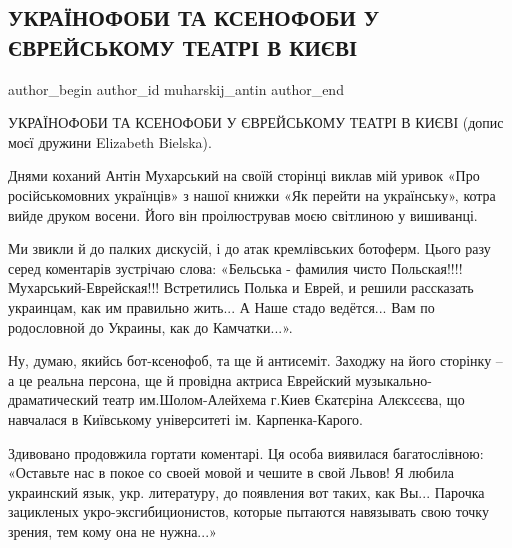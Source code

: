  
 
 
 
 
 
\subsection{УКРАЇНОФОБИ ТА КСЕНОФОБИ У ЄВРЕЙСЬКОМУ ТЕАТРІ В КИЄВІ}
\label{sec:27_07_2021.fb.muharskij_antin.1.kiev_ksenofobia_teatr}
 
\ifcmt
 author_begin
   author_id muharskij_antin
 author_end
\fi

УКРАЇНОФОБИ ТА КСЕНОФОБИ У ЄВРЕЙСЬКОМУ ТЕАТРІ В КИЄВІ (допис моєї дружини Elizabeth Bielska).

Днями коханий Антін Мухарський на своїй сторінці виклав мій уривок «Про
російськомовних українців» з нашої книжки «Як перейти на українську», котра
вийде друком восени. Його він проілюстрував моєю світлиною у вишиванці. 

Ми звикли й до палких дискусій, і до атак кремлівських ботоферм. Цього разу
серед коментарів зустрічаю слова: «Бельська - фамилия чисто Польская!!!!
Мухарський-Еврейская!!! Встретились Полька и Еврей, и решили рассказать
украинцам, как им правильно жить... А Наше стадо ведётся... Вам по родословной
до Украины, как до Камчатки...». 

Ну, думаю, якийсь бот-ксенофоб, та ще й антисеміт. Заходжу на його сторінку – а
це реальна персона, ще й провідна актриса Еврейский музыкально-драматический
театр им.Шолом-Алейхема г.Киев Єкатєріна Алєксєєва, що навчалася в Київському
університеті ім. Карпенка-Карого.

Здивовано продовжила гортати коментарі. Ця особа виявилася багатослівною:
«Оставьте нас в покое со своей мовой и чешите в свой Львов! Я любила украинский
язык, укр. литературу, до появления вот таких, как Вы... Парочка зацикленых
укро-эксгибиционистов, которые пытаются навязывать свою точку зрения, тем кому
она не нужна...»


